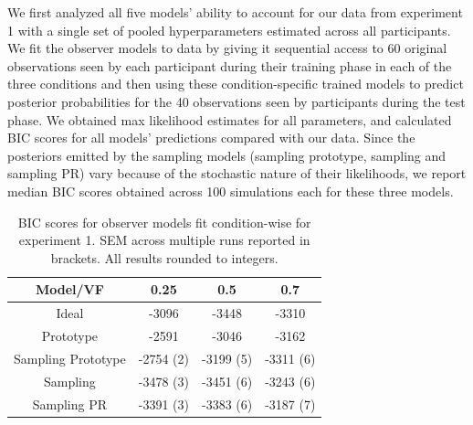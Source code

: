 \documentclass[10pt,letterpaper]{article}
\begin{document}
We first analyzed all five models' ability to account for our data from experiment 1 with a single set of pooled hyperparameters estimated across all participants. We fit the observer models to data by giving it sequential access to 60 original observations seen by each participant during their training phase in each of the three conditions and then using these condition-specific trained models to predict posterior probabilities for the 40 observations seen by participants during the test phase. We obtained max likelihood estimates for all parameters, and calculated BIC scores for all models' predictions compared with our data. Since the posteriors emitted by the sampling models (sampling prototype, sampling and sampling PR) vary because of the stochastic nature of their likelihoods, we report median BIC scores obtained across 100 simulations each for these three models. 

\begin{table}[]
    \centering
    \begin{tabular}{|c|c|c|c|}
    \hline
         Model/VF & 0.25 & 0.5 & 0.7 \\
         \hline
         Ideal & -3096 & -3448 & -3310 \\
         Prototype & -2591 & -3046 & -3162 \\
         Sampling Prototype & -2754 (2) & -3199 (5) & -3311 (6) \\
         Sampling & -3478 (3) & -3451 (6) & -3243 (6) \\
         Sampling PR & -3391 (3) & -3383 (6) & -3187 (7) \\
         \hline 
    \end{tabular}
    \caption{BIC scores for observer models fit condition-wise for experiment 1. SEM across multiple runs reported in brackets. All results rounded to integers.}
    \label{tab:bic}
\end{table}

\end{document}
